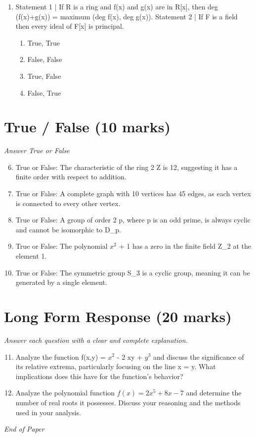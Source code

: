 \documentclass[12pt]{article}
\begin{document}
\begin{enumerate}[label=\arabic*.]
\begin{enumerate}[label=(\alph*)]
    \item 3
\end{enumerate}
\item Statement 1 | If R is a ring and f(x) and g(x) are in R[x], then deg (f(x)+g(x)) = maximum (deg f(x), deg g(x)). Statement 2 | If F is a field then every ideal of F[x] is principal.
\begin{enumerate}[label=(\alph*)]
    \item True, True
    \item False, False
    \item True, False
    \item False, True
\end{enumerate}
\end{enumerate}

\section*{True / False (10 marks)}
\textit{Answer True or False}
\begin{enumerate}[label=\arabic*.]
\setcounter{enumi}{5}
\item True or False: The characteristic of the ring 2 Z is 12, suggesting it has a finite order with respect to addition.
\item True or False: A complete graph with 10 vertices has 45 edges, as each vertex is connected to every other vertex.
\item True or False: A group of order 2 p, where p is an odd prime, is always cyclic and cannot be isomorphic to D\_p.
\item True or False: The polynomial $x^2$ + 1 has a zero in the finite field Z\_2 at the element 1.
\item True or False: The symmetric group S\_3 is a cyclic group, meaning it can be generated by a single element.
\end{enumerate}

\section*{Long Form Response (20 marks)}
\textit{Answer each question with a clear and complete explanation.}
\begin{enumerate}[label=\arabic*.]
\setcounter{enumi}{10}
\item Analyze the function f(x,y) = $x^2$ - 2 xy + $y^3$ and discuss the significance of its relative extrema, particularly focusing on the line x = y. What implications does this have for the function's behavior?
\item Analyze the polynomial function \( f(x) = 2 x^5 + 8 x - 7 \) and determine the number of real roots it possesses. Discuss your reasoning and the methods used in your analysis.
\end{enumerate}

\vfill
\noindent\textit{End of Paper}
\end{document}
